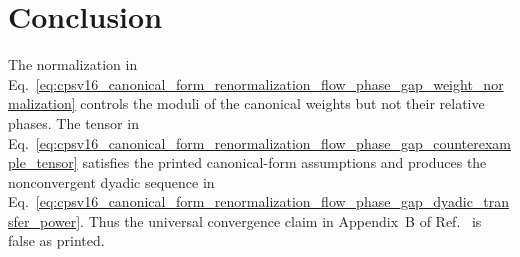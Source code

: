 \documentclass{article}
\begin{document}
\section{Conclusion}

The normalization in
Eq.~\ref{eq:cpsv16_canonical_form_renormalization_flow_phase_gap_weight_normalization}
controls the moduli of the canonical weights but not their relative phases.
The tensor in
Eq.~\ref{eq:cpsv16_canonical_form_renormalization_flow_phase_gap_counterexample_tensor}
satisfies the printed canonical-form assumptions and produces the
nonconvergent dyadic sequence in
Eq.~\ref{eq:cpsv16_canonical_form_renormalization_flow_phase_gap_dyadic_transfer_power}.
Thus the universal convergence claim in Appendix~B of
Ref.~\cite{Cirac2016MPDO_arXiv} is false as printed.



\end{document}
